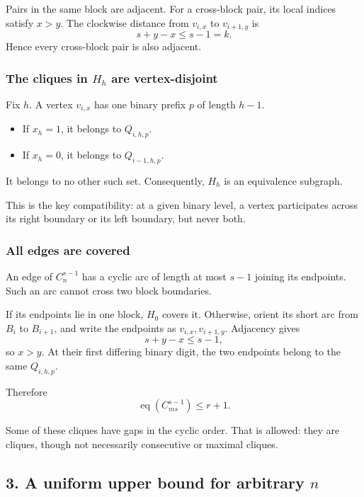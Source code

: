 \documentclass[
  11pt,
  a4paper,
]{article}
\providecommand{\tightlist}{%
  \setlength{\itemsep}{0pt}\setlength{\parskip}{0pt}}
\begin{document}
Pairs in the same block are adjacent. For a cross-block pair, its local
indices satisfy \(x>y\). The clockwise distance from \(v_{i,x}\) to
\(v_{i+1,y}\) is \[
s+y-x\le s-1=k.
\] Hence every cross-block pair is also adjacent.

\subsubsection{\texorpdfstring{The cliques in \(H_h\) are
vertex-disjoint}{The cliques in H\_h are vertex-disjoint}}\label{the-cliques-in-h_h-are-vertex-disjoint}

Fix \(h\). A vertex \(v_{i,x}\) has one binary prefix \(p\) of length
\(h-1\).

\begin{itemize}
\tightlist
\item
  If \(x_h=1\), it belongs to \(Q_{i,h,p}\).
\item
  If \(x_h=0\), it belongs to \(Q_{i-1,h,p}\).
\end{itemize}

It belongs to no other such set. Consequently, \(H_h\) is an equivalence
subgraph.

This is the key compatibility: at a given binary level, a vertex
participates across its right boundary or its left boundary, but never
both.

\subsubsection{All edges are covered}\label{all-edges-are-covered}

An edge of \(C_n^{s-1}\) has a cyclic arc of length at most \(s-1\)
joining its endpoints. Such an arc cannot cross two block boundaries.

If its endpoints lie in one block, \(H_0\) covers it. Otherwise, orient
its short arc from \(B_i\) to \(B_{i+1}\), and write the endpoints as
\(v_{i,x},v_{i+1,y}\). Adjacency gives \[
s+y-x\le s-1,
\] so \(x>y\). At their first differing binary digit, the two endpoints
belong to the same \(Q_{i,h,p}\).

Therefore \[
\operatorname{eq}(C_{ms}^{s-1})\le r+1.
\]

Some of these cliques have gaps in the cyclic order. That is allowed:
they are cliques, though not necessarily consecutive or maximal cliques.

\subsection{\texorpdfstring{3. A uniform upper bound for arbitrary
\(n\)}{3. A uniform upper bound for arbitrary n}}\label{a-uniform-upper-bound-for-arbitrary-n}
\end{document}
